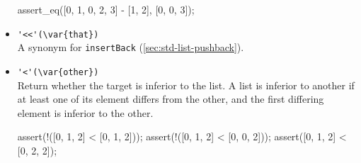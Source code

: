\begin{itemize}
\begin{urbiscript}[firstnumber=last]
assert_eq([0, 1, 0, 2, 3] - [1, 2], [0, 0, 3]);
\end{urbiscript}

\item \lstinline|'<<'(\var{that})|\\
A synonym for \lstinline|insertBack| (\autoref{sec:std-list-pushback}).

\item \lstinline|'<'(\var{other})|\\
Return whether the target is inferior to the  list. A list is
inferior to another if at least one of its element differs from the
other, and the first differing element is inferior to the other.

\begin{urbiscript}[firstnumber=last]
assert(!([0, 1, 2] < [0, 1, 2]));
assert(!([0, 1, 2] < [0, 0, 2]));
assert([0, 1, 2] < [0, 2, 2]);
\end{urbiscript}

\end{itemize}


